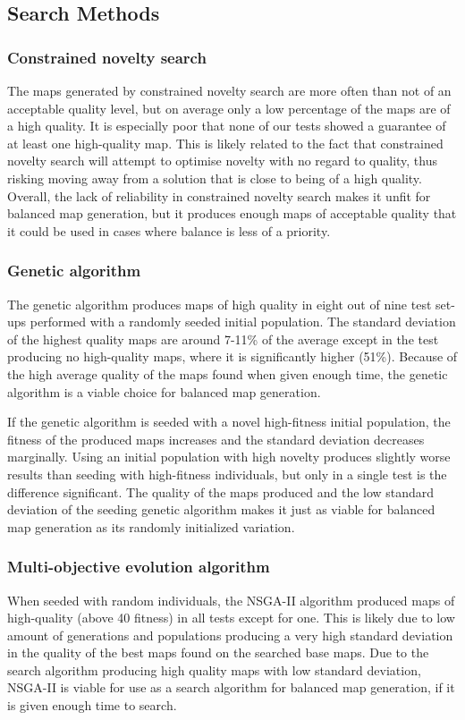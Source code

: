\subsection{Search Methods}
\label{discussion_quality_searchmethods}
\subsubsection{Constrained novelty search}
The maps generated by constrained novelty search are more often than not of an acceptable quality level, but on average only a low percentage of the maps are of a high quality. It is especially poor that none of our tests showed a guarantee of at least one high-quality map. This is likely related to the fact that constrained novelty search will attempt to optimise novelty with no regard to quality, thus risking moving away from a solution that is close to being of a high quality. Overall, the lack of reliability in constrained novelty search makes it unfit for balanced map generation, but it produces enough maps of acceptable quality that it could be used in cases where balance is less of a priority.

\subsubsection{Genetic algorithm}
The genetic algorithm produces maps of high quality in eight out of nine test set-ups performed with a randomly seeded initial population. The standard deviation of the highest quality maps are around 7-11\% of the average except in the test producing no high-quality maps, where it is significantly higher (51\%). Because of the high average quality of the maps found when given enough time, the genetic algorithm is a viable choice for balanced map generation. 

If the genetic algorithm is seeded with a novel high-fitness initial population, the fitness of the produced maps increases and the standard deviation decreases marginally. Using an initial population with high novelty produces slightly worse results than seeding with high-fitness individuals, but only in a single test is the difference significant. The quality of the maps produced and the low standard deviation of the seeding genetic algorithm makes it just as viable for balanced map generation as its randomly initialized variation.

\subsubsection{Multi-objective evolution algorithm}
When seeded with random individuals, the NSGA-II algorithm produced maps of high-quality (above 40 fitness) in all tests except for one. This is likely due to low amount of generations and populations producing a very high standard deviation in the quality of the best maps found on the searched base maps. Due to the search algorithm producing high quality maps with low standard deviation, NSGA-II is viable for use as a search algorithm for balanced map generation, if it is given enough time to search.


